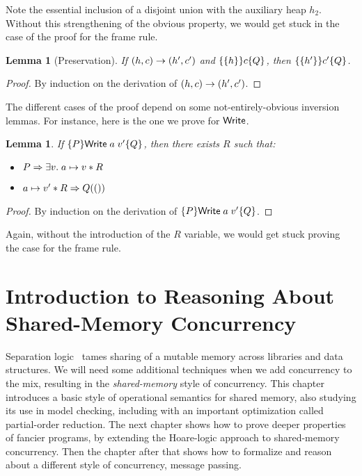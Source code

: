 \documentclass{amsbook}
\newtheorem{lemma}[theorem]{Lemma}
\theoremstyle{definition}
\theoremstyle{remark}
\numberwithin{section}{chapter}
\numberwithin{equation}{chapter}
\begin{document}
Note the essential inclusion of a disjoint union with the auxiliary heap $h_2$.
Without this strengthening of the obvious property, we would get stuck in the case of the proof for the frame rule.

\begin{lemma}[Preservation]
  If $(h, c) \to (h', c')$ and $\{\{h\}\} c \{Q\}$, then $\{\{h'\}\} c' \{Q\}$.
\end{lemma}
\begin{proof}
  By induction on the derivation of $(h, c) \to (h', c')$.
\end{proof}

The different cases of the proof depend on some not-entirely-obvious inversion lemmas.
For instance, here is the one we prove for $\mathsf{Write}$.

\begin{lemma}
  If $\{P\} \mathsf{Write} \; a \; v' \{Q\}$, then there exists $R$ such that:
  \begin{itemize}
  \item $P \Rightarrow \exists v. \; a \mapsto v * R$
  \item $a \mapsto v' * R \Rightarrow Q(())$
  \end{itemize}
\end{lemma}
\begin{proof}
  By induction on the derivation of $\{P\} \mathsf{Write} \; a \; v' \{Q\}$.
\end{proof}

Again, without the introduction of the $R$ variable, we would get stuck proving the case for the frame rule.



\chapter{Introduction to Reasoning About Shared-Memory Concurrency}

Separation logic~ tames sharing of a mutable memory across libraries and data structures.
We will need some additional techniques when we add concurrency to the mix, resulting in the \emph{shared-memory} style of concurrency.
This chapter introduces a basic style of operational semantics for shared memory, also studying its use in model checking, including with an important optimization called partial-order reduction.
The next chapter shows how to prove deeper properties of fancier programs, by extending the Hoare-logic approach to shared-memory concurrency.
Then the chapter after that shows how to formalize and reason about a different style of concurrency, message passing.
\end{document}

